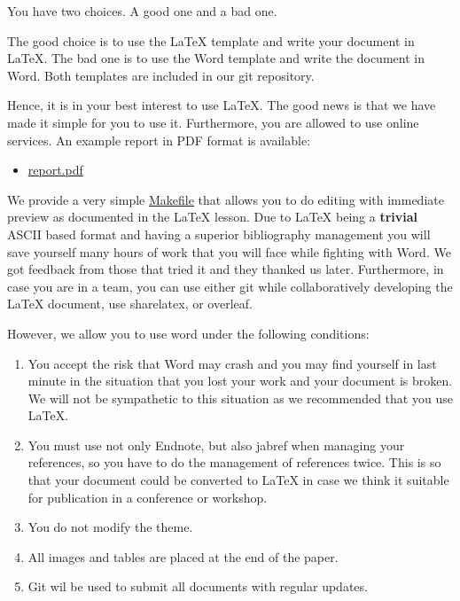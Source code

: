 You have two choices. A good one and a bad one.

The good choice is to use the LaTeX template and write your document in
LaTeX. The bad one is to use the Word template and write the document in
Word. Both templates are included in our git repository.

Hence, it is in your best interest to use LaTeX. The good news is that
we have made it simple for you to use it. Furthermore, you are allowed
to use online services. An example report in PDF format is available:

\begin{itemize}
\tightlist
\item
  \href{https://github.com/cloudmesh/classes/blob/master/docs/source/format/report/latex/report.pdf}{report.pdf}
\end{itemize}

We provide a very simple
\href{https://github.com/cloudmesh/classes/blob/master/docs/source/format/report/latex/Makefile}{Makefile}
that allows you to do editing with immediate preview as documented in
the LaTeX lesson. Due to LaTeX being a \textbf{trivial} ASCII based
format and having a superior bibliography management you will save
yourself many hours of work that you will face while fighting with Word.
We got feedback from those that tried it and they thanked us later.
Furthermore, in case you are in a team, you can use either git while
collaboratively developing the LaTeX document, use sharelatex, or
overleaf.

However, we allow you to use word under the following conditions:

\begin{enumerate}
\def\labelenumi{\arabic{enumi}.}
\tightlist
\item
  You accept the risk that Word may crash and you may find yourself in
  last minute in the situation that you lost your work and your document
  is broken. We will not be sympathetic to this situation as we
  recommended that you use LaTeX.
\item
  You must use not only Endnote, but also jabref when managing your
  references, so you have to do the management of references twice. This
  is so that your document could be converted to LaTeX in case we think
  it suitable for publication in a conference or workshop.
\item
  You do not modify the theme.
\item
  All images and tables are placed at the end of the paper.
\item
  Git wil be used to submit all documents with regular updates.
\end{enumerate}

